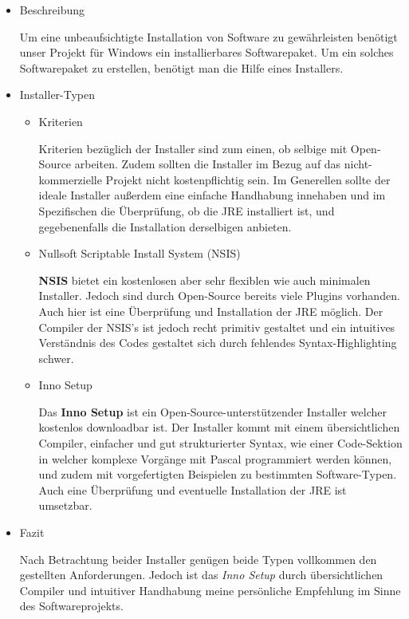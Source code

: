 {}
	\begin{itemize}
	\item Beschreibung
	
	
	Um eine unbeaufsichtigte Installation von Software zu gewährleisten benötigt unser Projekt für Windows ein installierbares Softwarepaket. Um ein solches Softwarepaket zu erstellen, benötigt man die Hilfe eines Installers.
	
	\item Installer-Typen
	
	
    \begin{itemize}
	\item Kriterien
	
	
	Kriterien bezüglich der Installer sind zum einen, ob selbige mit Open-Source arbeiten. Zudem sollten die Installer im Bezug auf das nicht-kommerzielle Projekt nicht kostenpflichtig sein. Im Generellen sollte der ideale Installer außerdem eine einfache Handhabung innehaben und im Spezifischen die Überprüfung, ob die JRE installiert ist, und gegebenenfalls die Installation derselbigen anbieten.
	
	\item Nullsoft Scriptable Install System (NSIS)
	
	
	\textbf{NSIS} bietet ein kostenlosen aber sehr flexiblen wie auch minimalen Installer. Jedoch sind durch Open-Source bereits viele Plugins vorhanden. Auch hier ist eine Überprüfung und Installation der JRE möglich. Der Compiler der NSIS's ist jedoch recht primitiv gestaltet und ein intuitives Verständnis des Codes gestaltet sich durch fehlendes Syntax-Highlighting schwer.
	
	\item Inno Setup
	
	
	Das \textbf{Inno Setup} ist ein Open-Source-unterstützender Installer welcher kostenlos downloadbar ist. Der Installer kommt mit einem übersichtlichen Compiler, einfacher und gut strukturierter Syntax, wie einer Code-Sektion in welcher komplexe Vorgänge mit Pascal programmiert werden können, und zudem mit vorgefertigten Beispielen zu bestimmten Software-Typen. Auch eine Überprüfung und eventuelle Installation der JRE ist umsetzbar. 
	\end{itemize}
	\item Fazit
	
	
	Nach Betrachtung beider Installer genügen beide Typen vollkommen den gestellten Anforderungen. Jedoch ist das \textit{Inno Setup} durch übersichtlichen Compiler und intuitiver Handhabung meine persönliche Empfehlung im Sinne des Softwareprojekts.
	\end{itemize}

\nsecend



